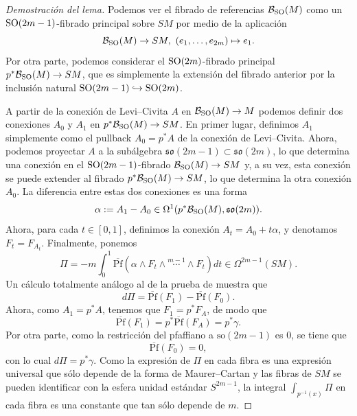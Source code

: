 \documentclass[11pt,a4paper]{amsbook}
\theoremstyle{remark} \newtheorem{rmk}[subsection]{Observación}
\theoremstyle{definition} \newtheorem{defn}[subsection]{Definición}
\theoremstyle{definition} \newtheorem{ex}[subsection]{Ejemplo}
\theoremstyle{definition} \newtheorem{ej}[subsection]{Ejercicio}
\begin{document}
\begin{proof}[Demostración del lema]
  Podemos ver el fibrado de referencias $\mathcal B_{\operatorname{SO}}(M)$ como un $\operatorname{SO}(2m-1)$-fibrado principal sobre $SM$ por medio de la aplicación
  \begin{equation*}
\mathcal B_{\operatorname{SO}}(M) \rightarrow SM,\ (e_1,\dots,e_{2m}) \mapsto e_1.
  \end{equation*}
  Por otra parte, podemos considerar el $\operatorname{SO}(2m)$-fibrado principal $p^*\mathcal B_{\operatorname{SO}}(M)\rightarrow SM$, que es simplemente la extensión del fibrado anterior por la inclusión natural $\operatorname{SO}(2m-1)\hookrightarrow \operatorname{SO}(2m)$.

  A partir de la conexión de Levi--Civita $A$ en $\mathcal B_{\operatorname{SO}}(M)\rightarrow M$ podemos definir dos conexiones $A_0$ y $A_1$ en $p^* \mathcal B_{\operatorname{SO}}(M)\rightarrow SM$. En primer lugar, definimos $A_1$ simplemente como el pullback $A_0=p^*A$ de la conexión de Levi--Civita. Ahora, podemos proyectar $A$ a la subálgebra $\mathfrak{so}(2m-1)\subset \mathfrak{so}(2m)$, lo que determina una conexión en el $\operatorname{SO}(2m-1)$-fibrado $\mathcal B_{\operatorname{SO}}(M)\rightarrow SM$ y, a su vez, esta conexión se puede extender al fibrado $p^*\mathcal B_{\operatorname{SO}}(M)\rightarrow SM$, lo que determina la otra conexión $A_0$. La diferencia entre estas dos conexiones es una forma
  \begin{equation*}
\alpha:= A_1 - A_0 \in \Omega^1(p^* \mathcal B_{\operatorname{SO}}(M),\mathfrak{so}(2m)).
  \end{equation*}
  Ahora, para cada $t\in [0,1]$, definimos la conexión $A_t = A_0 +t \alpha$, y denotamos $F_t=F_{A_t}$. Finalmente, ponemos
  \begin{equation*}
\Pi = -m \int_0^1 \overline{\mathrm{Pf}}(\alpha \wedge F_t \wedge \overset{m-1}{\cdots}\wedge F_t) dt \in \Omega^{2m-1}(SM).
  \end{equation*}
  Un cálculo totalmente análogo al de la prueba de  muestra que
\begin{equation*}
d\Pi = \overline{\mathrm{Pf}}(F_1)- \overline{\mathrm{Pf}}(F_0).
\end{equation*}
Ahora, como $A_1 = p^* A$, tenemos que $F_1 = p^* F_A$, de modo que
\begin{equation*}
\overline{\mathrm{Pf}}(F_1) = p^* \overline{\mathrm{Pf}}(F_A) = p^* \gamma.
\end{equation*}
Por otra parte, como la restricción del pfaffiano a $\mathrm{so}(2m-1)$ es $0$, se tiene que
\begin{equation*}
\overline{\mathrm{Pf}}(F_0) = 0,
\end{equation*}
con lo cual $d\Pi = p^*\gamma$. Como la expresión de $\Pi$ en cada fibra es una expresión universal que sólo depende de la forma de Maurer--Cartan y las fibras de $SM$ se pueden identificar con la esfera unidad estándar $S^{2m-1}$, la integral $\int_{p^{-1}(x)}\Pi$ en cada fibra es una constante que tan sólo depende de $m$.
\end{proof}
\end{document}
